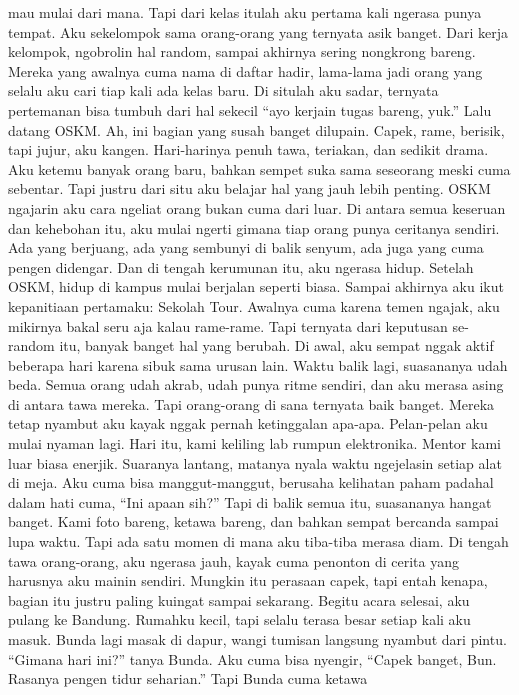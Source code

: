 \documentclass[
  letterpaper,
  DIV=11,
  numbers=noendperiod]{scrreprt}
\begin{document}
mau mulai dari mana. Tapi dari kelas itulah aku pertama kali ngerasa
punya tempat. Aku sekelompok sama orang-orang yang ternyata asik banget.
Dari kerja kelompok, ngobrolin hal random, sampai akhirnya sering
nongkrong bareng. Mereka yang awalnya cuma nama di daftar hadir,
lama-lama jadi orang yang selalu aku cari tiap kali ada kelas baru. Di
situlah aku sadar, ternyata pertemanan bisa tumbuh dari hal sekecil
``ayo kerjain tugas bareng, yuk.'' Lalu datang OSKM. Ah, ini bagian yang
susah banget dilupain. Capek, rame, berisik, tapi jujur, aku kangen.
Hari-harinya penuh tawa, teriakan, dan sedikit drama. Aku ketemu banyak
orang baru, bahkan sempet suka sama seseorang meski cuma sebentar. Tapi
justru dari situ aku belajar hal yang jauh lebih penting. OSKM ngajarin
aku cara ngeliat orang bukan cuma dari luar. Di antara semua keseruan
dan kehebohan itu, aku mulai ngerti gimana tiap orang punya ceritanya
sendiri. Ada yang berjuang, ada yang sembunyi di balik senyum, ada juga
yang cuma pengen didengar. Dan di tengah kerumunan itu, aku ngerasa
hidup. Setelah OSKM, hidup di kampus mulai berjalan seperti biasa.
Sampai akhirnya aku ikut kepanitiaan pertamaku: Sekolah Tour. Awalnya
cuma karena temen ngajak, aku mikirnya bakal seru aja kalau rame-rame.
Tapi ternyata dari keputusan se-random itu, banyak banget hal yang
berubah. Di awal, aku sempat nggak aktif beberapa hari karena sibuk sama
urusan lain. Waktu balik lagi, suasananya udah beda. Semua orang udah
akrab, udah punya ritme sendiri, dan aku merasa asing di antara tawa
mereka. Tapi orang-orang di sana ternyata baik banget. Mereka tetap
nyambut aku kayak nggak pernah ketinggalan apa-apa. Pelan-pelan aku
mulai nyaman lagi. Hari itu, kami keliling lab rumpun elektronika.
Mentor kami luar biasa enerjik. Suaranya lantang, matanya nyala waktu
ngejelasin setiap alat di meja. Aku cuma bisa manggut-manggut, berusaha
kelihatan paham padahal dalam hati cuma, ``Ini apaan sih?'' Tapi di
balik semua itu, suasananya hangat banget. Kami foto bareng, ketawa
bareng, dan bahkan sempat bercanda sampai lupa waktu. Tapi ada satu
momen di mana aku tiba-tiba merasa diam. Di tengah tawa orang-orang, aku
ngerasa jauh, kayak cuma penonton di cerita yang harusnya aku mainin
sendiri. Mungkin itu perasaan capek, tapi entah kenapa, bagian itu
justru paling kuingat sampai sekarang. Begitu acara selesai, aku pulang
ke Bandung. Rumahku kecil, tapi selalu terasa besar setiap kali aku
masuk. Bunda lagi masak di dapur, wangi tumisan langsung nyambut dari
pintu. ``Gimana hari ini?'' tanya Bunda. Aku cuma bisa nyengir, ``Capek
banget, Bun. Rasanya pengen tidur seharian.'' Tapi Bunda cuma ketawa
\end{document}
